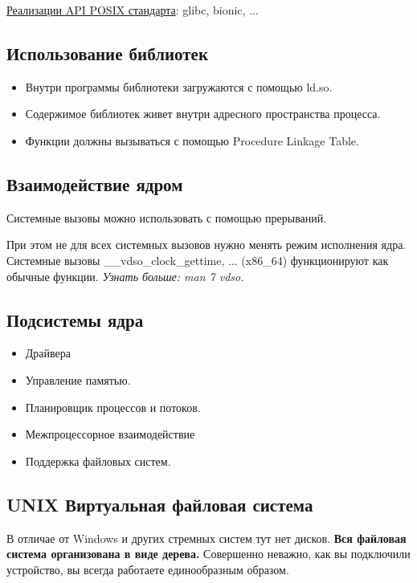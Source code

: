 \underline{Реализации API POSIX стандарта}: glibc, bionic, ...


\subsection{Использование библиотек}

\begin{itemize}
	\item Внутри программы библиотеки загружаются с помощью ld.so.
	\item Содержимое библиотек живет внутри адресного пространства процесса.
	\item Функции должны вызываться с помощью Procedure Linkage Table.
\end{itemize}


\subsection{Взаимодействие ядром}

Системные вызовы можно использовать с помощью прерываний. 

При этом не для всех системных вызовов нужно менять режим исполнения ядра. 
Системные вызовы \_\_vdso\_clock\_gettime, ... (x86\_64) функционируют как обычные функции.
\textit{Узнать больше: man 7 vdso.}

\subsection{Подсистемы ядра}

\begin{itemize}
	\item Драйвера
	\item Управление памятью.
	\item Планировщик процессов и потоков.
	\item Межпроцессорное взаимодействие
	\item Поддержка файловых систем.
\end{itemize}

\subsection{UNIX Виртуальная файловая система}

В отличае от Windows и других стремных систем тут нет дисков. \textbf{Вся файловая система 
организована в виде дерева.} Совершенно неважно, как вы подключили устройство, вы всегда
работаете единообразным образом.

